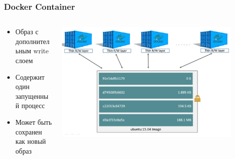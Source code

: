 \documentclass[xetex,mathserif,serif]{beamer}
\begin{document}
    \begin{frame}
        \frametitle{Docker Container}
        \begin{columns}
            \begin{column}{0.5\textwidth}
                \begin{itemize}
                    \item Образ с дополнительным write слоем
                    \item Содержит один запущенный процесс
                    \item Может быть сохранен как новый образ
                \end{itemize}
            \end{column}
            \begin{column}{0.5\textwidth}
                \includegraphics[width=0.9\textwidth]{dockerContainer.png}
            \end{column}
        \end{columns}
    \end{frame}
\end{document}

